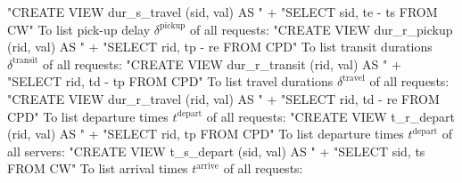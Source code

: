 "CREATE VIEW dur_s_travel (sid, val) AS "
  + "SELECT sid, te - ts FROM CW"
\nwendcode{}\nwdocspar
To list pick-up delay $\delta^\textrm{pickup}$ of all requests:
\nwenddocs{}\endmoddef{}
"CREATE VIEW dur_r_pickup (rid, val) AS "
  + "SELECT rid, tp - re FROM CPD"
\nwendcode{}\nwdocspar
To list transit durations $\delta^\textrm{transit}$ of all requests:
\nwenddocs{}\endmoddef{}
"CREATE VIEW dur_r_transit (rid, val) AS "
  + "SELECT rid, td - tp FROM CPD"
\nwendcode{}\nwdocspar
To list travel durations $\delta^\textrm{travel}$ of all requests:
\nwenddocs{}\endmoddef{}
"CREATE VIEW dur_r_travel (rid, val) AS "
  + "SELECT rid, td - re FROM CPD"
\nwendcode{}\nwdocspar
To list departure times $t^\textrm{depart}$ of all requests:
\nwenddocs{}\endmoddef{}
"CREATE VIEW t_r_depart (rid, val) AS "
  + "SELECT rid, tp FROM CPD"
\nwendcode{}\nwdocspar
To list departure times $t^\textrm{depart}$ of all servers:
\nwenddocs{}\endmoddef{}
"CREATE VIEW t_s_depart (sid, val) AS "
  + "SELECT sid, ts FROM CW"
\nwendcode{}\nwdocspar
To list arrival times $t^\textrm{arrive}$ of all requests:
